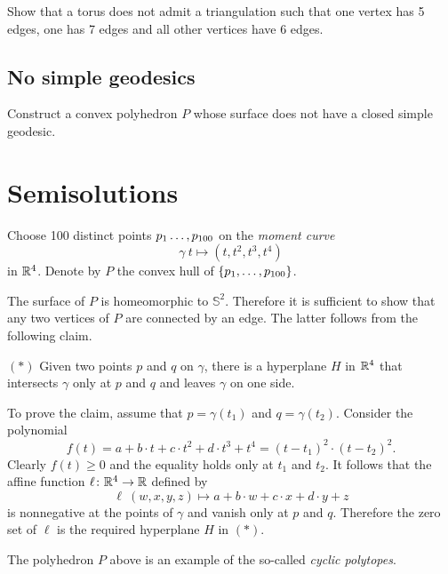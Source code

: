 \begin{pr}
Show that a torus does not admit a triangulation 
such that one vertex has 5 edges,
one has 7 edges and 
all other vertices have 
6 edges. 
\end{pr}


\subsection*{No simple geodesics\easy}\label{No simple geodesics}

\begin{pr}
Construct a convex polyhedron $P$ whose surface 
does not have a closed simple geodesic.
\end{pr}

\section*{Semisolutions}


Choose 100 distinct points $p_1\z\dots,p_{100}$
on the {}\emph{moment curve} 
\[\gamma\:t\mapsto (t,t^2,t^3,t^4)\] 
in $\mathbb{R}^4$.
Denote by $P$ the convex hull of $\{p_1,\z\dots,p_{100}\}$.

The surface of $P$ is homeomorphic to $\mathbb{S}^2$.
Therefore it is sufficient to show that any two vertices of $P$ are connected by an edge.
The latter follows from the following claim.

\begin{cl}{$({*})$}
Given two points $p$ and $q$ on $\gamma$, there is a hyperplane $H$ in $\mathbb{R}^4$ that intersects $\gamma$ only at $p$ and $q$ and leaves $\gamma$ on one side.
\end{cl}

To prove the claim, assume that $p=\gamma(t_1)$ and $q=\gamma(t_2)$. 
Consider the polynomial
\[f(t)=a+b\cdot t+c\cdot t^2+d\cdot t^3+t^4=(t-t_1)^2\cdot(t-t_2)^2.\]
Clearly $f(t)\ge 0$ and the equality holds only at $t_1$ and $t_2$.
It follows that the affine function $\ell\colon\mathbb{R}^4\to\mathbb{R}$ defined by 
\[\ell\:(w,x,y,z)\mapsto a+b\cdot w+c\cdot x+d\cdot y+z\]
is nonnegative at the points of $\gamma$ and vanish only at $p$ and $q$.
Therefore the zero set of $\ell$ is the required hyperplane $H$ in $({*})$. 
\qeds

The polyhedron $P$ above is an example of the so-called \emph{cyclic polytopes}.

